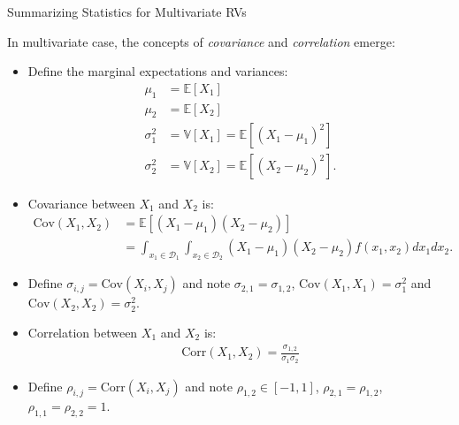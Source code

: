 \documentclass[9pt]{beamer}
\begin{document}
%
\begin{frame}{Summarizing Statistics for Multivariate RVs}

In multivariate case, the concepts of {\em covariance} and {\em correlation} emerge:
\begin{itemize}
\item Define the marginal expectations and variances:
\begin{align*}
\mu_{1}&=\mathbb{E}[X_1]\\
\mu_{2}&=\mathbb{E}[X_2]\\
\sigma_1^2&=\mathbb{V}[X_1]=\mathbb{E}[(X_1-\mu_1)^2]\\
\sigma_2^2&=\mathbb{V}[X_2]=\mathbb{E}[(X_2-\mu_2)^2].
\end{align*}
\item Covariance between $X_1$ and $X_2$ is:
 \begin{align*}
\textrm{Cov}(X_1,X_2)&=\mathbb{E}[(X_1-\mu_1)(X_2-\mu_2)]\\
&=\int_{x_1\in \mathcal{D}_1}\int_{x_2\in\mathcal{D}_2}(X_1-\mu_1)(X_2-\mu_2)f(x_1,x_2)dx_1dx_2.
\end{align*}
\item Define $\sigma_{i,j}=\textrm{Cov}(X_i,X_j)$ and note $\sigma_{2,1}=\sigma_{1,2}$, $\textrm{Cov}(X_1,X_1)=\sigma_1^2$ and $\textrm{Cov}(X_2,X_2)=\sigma_2^2$. 
\item Correlation between $X_1$ and $X_2$ is:
 \begin{align*}
\textrm{Corr}(X_1,X_2)=\frac{\sigma_{1,2}}{\sigma_1\sigma_2}
\end{align*}
\item  Define $\rho_{i,j}=\textrm{Corr}(X_i,X_j)$ and note $\rho_{1,2}\in [-1,1]$, $\rho_{2,1}=\rho_{1,2}$, $\rho_{1,1}=\rho_{2,2}=1$. 
\end{itemize}

\end{frame}
\end{document}
